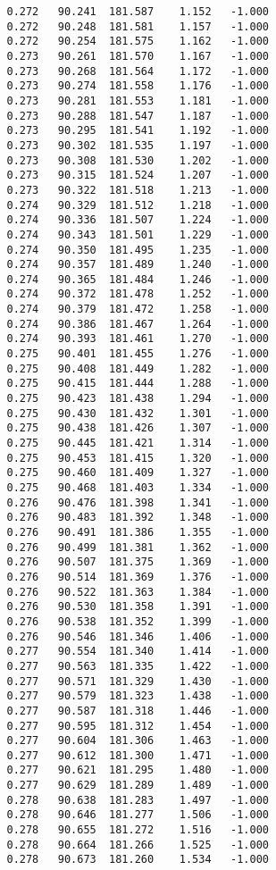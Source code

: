 \begin{verbatim}
   0.272   90.241  181.587    1.152   -1.000
   0.272   90.248  181.581    1.157   -1.000
   0.272   90.254  181.575    1.162   -1.000
   0.273   90.261  181.570    1.167   -1.000
   0.273   90.268  181.564    1.172   -1.000
   0.273   90.274  181.558    1.176   -1.000
   0.273   90.281  181.553    1.181   -1.000
   0.273   90.288  181.547    1.187   -1.000
   0.273   90.295  181.541    1.192   -1.000
   0.273   90.302  181.535    1.197   -1.000
   0.273   90.308  181.530    1.202   -1.000
   0.273   90.315  181.524    1.207   -1.000
   0.273   90.322  181.518    1.213   -1.000
   0.274   90.329  181.512    1.218   -1.000
   0.274   90.336  181.507    1.224   -1.000
   0.274   90.343  181.501    1.229   -1.000
   0.274   90.350  181.495    1.235   -1.000
   0.274   90.357  181.489    1.240   -1.000
   0.274   90.365  181.484    1.246   -1.000
   0.274   90.372  181.478    1.252   -1.000
   0.274   90.379  181.472    1.258   -1.000
   0.274   90.386  181.467    1.264   -1.000
   0.274   90.393  181.461    1.270   -1.000
   0.275   90.401  181.455    1.276   -1.000
   0.275   90.408  181.449    1.282   -1.000
   0.275   90.415  181.444    1.288   -1.000
   0.275   90.423  181.438    1.294   -1.000
   0.275   90.430  181.432    1.301   -1.000
   0.275   90.438  181.426    1.307   -1.000
   0.275   90.445  181.421    1.314   -1.000
   0.275   90.453  181.415    1.320   -1.000
   0.275   90.460  181.409    1.327   -1.000
   0.275   90.468  181.403    1.334   -1.000
   0.276   90.476  181.398    1.341   -1.000
   0.276   90.483  181.392    1.348   -1.000
   0.276   90.491  181.386    1.355   -1.000
   0.276   90.499  181.381    1.362   -1.000
   0.276   90.507  181.375    1.369   -1.000
   0.276   90.514  181.369    1.376   -1.000
   0.276   90.522  181.363    1.384   -1.000
   0.276   90.530  181.358    1.391   -1.000
   0.276   90.538  181.352    1.399   -1.000
   0.276   90.546  181.346    1.406   -1.000
   0.277   90.554  181.340    1.414   -1.000
   0.277   90.563  181.335    1.422   -1.000
   0.277   90.571  181.329    1.430   -1.000
   0.277   90.579  181.323    1.438   -1.000
   0.277   90.587  181.318    1.446   -1.000
   0.277   90.595  181.312    1.454   -1.000
   0.277   90.604  181.306    1.463   -1.000
   0.277   90.612  181.300    1.471   -1.000
   0.277   90.621  181.295    1.480   -1.000
   0.277   90.629  181.289    1.489   -1.000
   0.278   90.638  181.283    1.497   -1.000
   0.278   90.646  181.277    1.506   -1.000
   0.278   90.655  181.272    1.516   -1.000
   0.278   90.664  181.266    1.525   -1.000
   0.278   90.673  181.260    1.534   -1.000

\end{verbatim}
